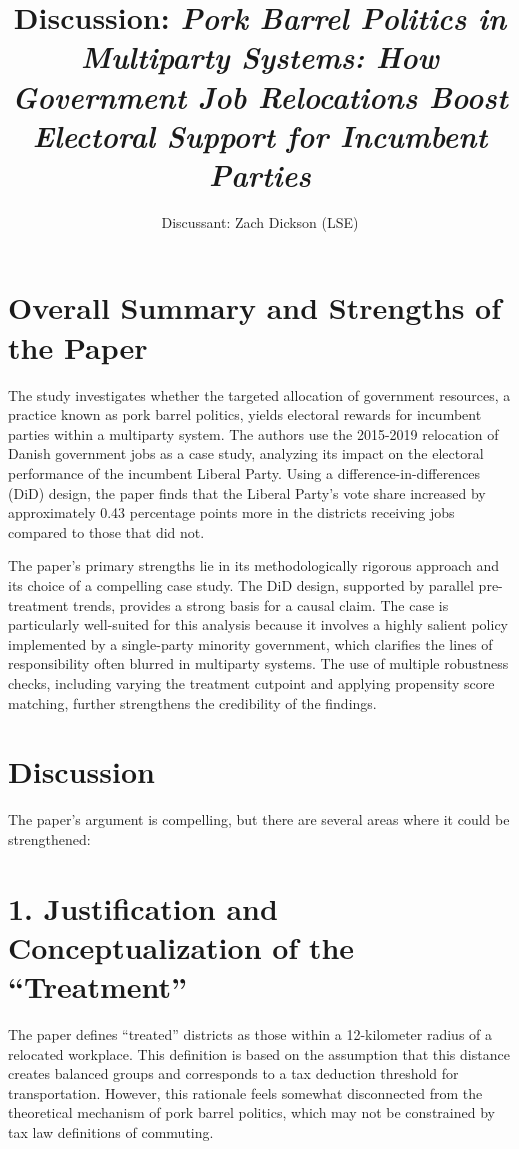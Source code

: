 \documentclass[
  letterpaper,
  DIV=11,
  numbers=noendperiod]{scrartcl}
\title{Discussion: \emph{Pork Barrel Politics in Multiparty Systems: How
Government Job Relocations Boost Electoral Support for Incumbent
Parties}}
\author{Discussant: Zach Dickson (LSE)}
\date{}
\begin{document}
\maketitle

\section{Overall Summary and Strengths of the
Paper}\label{overall-summary-and-strengths-of-the-paper}

The study investigates whether the targeted allocation of government
resources, a practice known as pork barrel politics, yields electoral
rewards for incumbent parties within a multiparty system. The authors
use the 2015-2019 relocation of Danish government jobs as a case study,
analyzing its impact on the electoral performance of the incumbent
Liberal Party. Using a difference-in-differences (DiD) design, the paper
finds that the Liberal Party's vote share increased by approximately
0.43 percentage points more in the districts receiving jobs compared to
those that did not.

The paper's primary strengths lie in its methodologically rigorous
approach and its choice of a compelling case study. The DiD design,
supported by parallel pre-treatment trends, provides a strong basis for
a causal claim. The case is particularly well-suited for this analysis
because it involves a highly salient policy implemented by a
single-party minority government, which clarifies the lines of
responsibility often blurred in multiparty systems. The use of multiple
robustness checks, including varying the treatment cutpoint and applying
propensity score matching, further strengthens the credibility of the
findings.

\section{Discussion}\label{discussion}

The paper's argument is compelling, but there are several areas where it
could be strengthened:

\section{1. Justification and Conceptualization of the
``Treatment''}\label{justification-and-conceptualization-of-the-treatment}

The paper defines ``treated'' districts as those within a 12-kilometer
radius of a relocated workplace. This definition is based on the
assumption that this distance creates balanced groups and corresponds to
a tax deduction threshold for transportation. However, this rationale
feels somewhat disconnected from the theoretical mechanism of pork
barrel politics, which may not be constrained by tax law definitions of
commuting.
\end{document}
